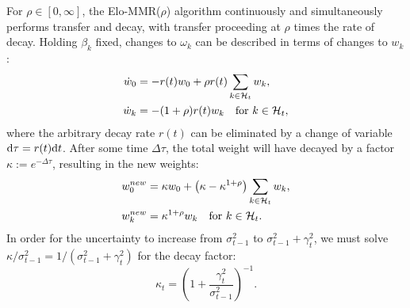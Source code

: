For $\rho\in [0,\infty]$, the Elo-MMR($\rho$) algorithm continuously and simultaneously performs transfer and decay, with transfer proceeding at $\rho$ times the rate of decay. Holding $\beta_k$ fixed, changes to $\omega_k$ can be described in terms of changes to $w_k$:
\begin{align*}
\dot w_0 &= -r(t)w_0 + \rho r(t) \sum_{k\in{\mathcal{H}}_t} w_k,
\\\dot w_k &= -(1+\rho)r(t)w_k \quad\text{for }k\in{\mathcal{H}}_t,
\end{align*}
where the arbitrary decay rate $r(t)$ can be eliminated by a change of variable $\mathrm{d}\tau = r(t)\mathrm{d}t$. After some time $\Delta\tau$, the total weight will have decayed by a factor $\kappa := e^{-\Delta\tau}$, resulting in the new weights:
\begin{align*}
w_0^{new} &= \kappa w_0 + \left(\kappa-\kappa^{1+\rho}\right)\sum_{k\in{\mathcal{H}}_t} w_k,
\\w_k^{new} &= \kappa^{1+\rho}w_k \quad\text{for }k\in{\mathcal{H}}_t.
\end{align*}
In order for the uncertainty to increase from $\sigma_{t-1}^2$ to $\sigma_{t-1}^2+\gamma_t^2$, we must solve $\kappa/\sigma_{t-1}^2 = 1/(\sigma_{t-1}^2+\gamma_t^2)$ for the decay factor:
\[\kappa_t = \left(1 + \frac{\gamma_t^2}{\sigma_{t-1}^2}\right)^{-1}.\]

